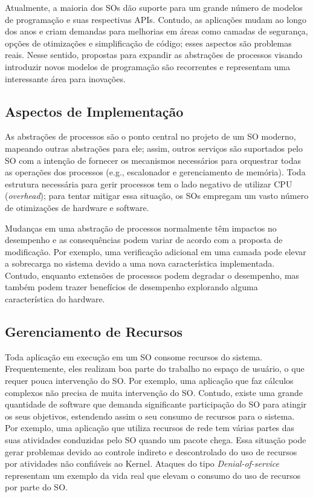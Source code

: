Atualmente, a maioria dos SOs dão suporte para um grande número de modelos de
programação e suas respectivas APIs. Contudo, as aplicações mudam ao longo dos
anos e criam demandas para melhorias em áreas como camadas de segurança, opções
de otimizações e simplificação de código; esses aspectos são problemas reais.
Nesse sentido, propostas para expandir as abstrações de processos visando
introduzir novos modelos de programação são recorrentes e representam uma
interessante área para inovações.

\subsection{Aspectos de Implementação}

As abstrações de processos são o ponto central no projeto de um SO moderno,
mapeando outras abstrações para ele; assim, outros serviços são suportados pelo
SO com a intenção de fornecer os mecanismos necessários para orquestrar todas
as operações dos processos (e.g., escalonador e gerenciamento de memória). Toda
estrutura necessária para gerir processos tem o lado negativo de utilizar CPU
(\emph{overhead}); para tentar mitigar essa situação, os SOs empregam um vasto
número de otimizações de hardware e software.

Mudanças em uma abstração de processos normalmente têm impactos no desempenho e
as consequências podem variar de acordo com a proposta de modificação. Por
exemplo, uma verificação adicional em uma camada pode elevar a sobrecarga no
sistema devido a uma nova característica implementada. Contudo, enquanto
extensões de processos podem degradar o desempenho, mas também podem trazer
benefícios de desempenho explorando alguma característica do hardware.

\subsection{Gerenciamento de Recursos}

Toda aplicação em execução em um SO consome recursos do sistema.
Frequentemente, eles realizam boa parte do trabalho no espaço de usuário, o que
requer pouca intervenção do SO. Por exemplo, uma aplicação que faz cálculos
complexos não precisa de muita intervenção do SO. Contudo, existe uma grande
quantidade de software que demanda significante participação do SO para
atingir os seus objetivos, estendendo assim o seu consumo de recursos para o
sistema. Por exemplo, uma aplicação que utiliza recursos de rede tem várias
partes das suas atividades conduzidas pelo SO quando um pacote chega. Essa
situação pode gerar problemas devido ao controle indireto e descontrolado do
uso de recursos por atividades não confiáveis ao Kernel. Ataques do tipo
\emph{Denial-of-service} representam um exemplo da vida real que elevam o
consumo do uso de recursos por parte do SO.

